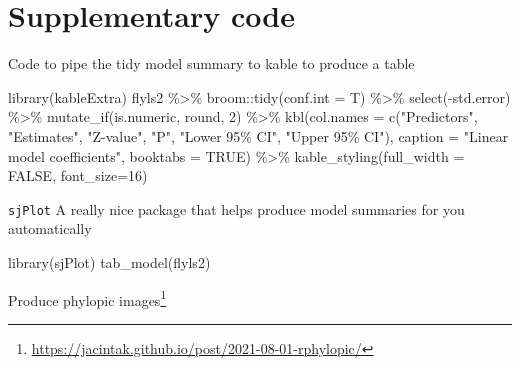 \documentclass[
]{book}
\newenvironment{Shaded}{\begin{snugshade}}{\end{snugshade}}
\newcommand{\AttributeTok}[1]{\textcolor[rgb]{0.77,0.63,0.00}{#1}}
\newcommand{\ConstantTok}[1]{\textcolor[rgb]{0.00,0.00,0.00}{#1}}
\newcommand{\DecValTok}[1]{\textcolor[rgb]{0.00,0.00,0.81}{#1}}
\newcommand{\FunctionTok}[1]{\textcolor[rgb]{0.00,0.00,0.00}{#1}}
\newcommand{\NormalTok}[1]{#1}
\newcommand{\SpecialCharTok}[1]{\textcolor[rgb]{0.00,0.00,0.00}{#1}}
\newcommand{\StringTok}[1]{\textcolor[rgb]{0.31,0.60,0.02}{#1}}
\begin{document}
\hypertarget{supplementary-code}{%
\section{Supplementary code}\label{supplementary-code}}

Code to pipe the tidy model summary to kable to produce a table

\begin{Shaded}
\begin{Highlighting}[]
\FunctionTok{library}\NormalTok{(kableExtra)}
\NormalTok{flyls2 }\SpecialCharTok{\%\textgreater{}\%}\NormalTok{ broom}\SpecialCharTok{::}\FunctionTok{tidy}\NormalTok{(}\AttributeTok{conf.int =}\NormalTok{ T) }\SpecialCharTok{\%\textgreater{}\%} 
 \FunctionTok{select}\NormalTok{(}\SpecialCharTok{{-}}\StringTok{\textasciigrave{}}\AttributeTok{std.error}\StringTok{\textasciigrave{}}\NormalTok{) }\SpecialCharTok{\%\textgreater{}\%} 
\FunctionTok{mutate\_if}\NormalTok{(is.numeric, round, }\DecValTok{2}\NormalTok{) }\SpecialCharTok{\%\textgreater{}\%} 
\FunctionTok{kbl}\NormalTok{(}\AttributeTok{col.names =} \FunctionTok{c}\NormalTok{(}\StringTok{"Predictors"}\NormalTok{,}
                    \StringTok{"Estimates"}\NormalTok{,}
                    \StringTok{"Z{-}value"}\NormalTok{,}
                    \StringTok{"P"}\NormalTok{,}
                    \StringTok{"Lower 95\% CI"}\NormalTok{,}
                    \StringTok{"Upper 95\% CI"}\NormalTok{),}
      \AttributeTok{caption =} \StringTok{"Linear model coefficients"}\NormalTok{, }
    \AttributeTok{booktabs =} \ConstantTok{TRUE}\NormalTok{) }\SpecialCharTok{\%\textgreater{}\%} 
   \FunctionTok{kable\_styling}\NormalTok{(}\AttributeTok{full\_width =} \ConstantTok{FALSE}\NormalTok{, }\AttributeTok{font\_size=}\DecValTok{16}\NormalTok{)}
\end{Highlighting}
\end{Shaded}

\texttt{sjPlot} A really nice package that helps produce model summaries for you automatically

\begin{Shaded}
\begin{Highlighting}[]
\FunctionTok{library}\NormalTok{(sjPlot)}
\FunctionTok{tab\_model}\NormalTok{(flyls2)}
\end{Highlighting}
\end{Shaded}

Produce phylopic images\footnote{\url{https://jacintak.github.io/post/2021-08-01-rphylopic/}}
\end{document}
